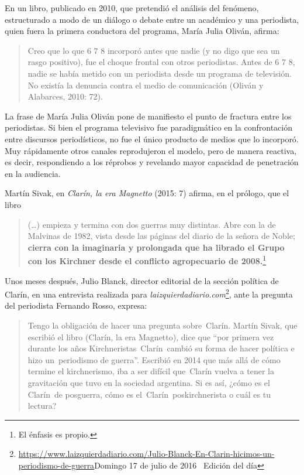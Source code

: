 En un libro, publicado en 2010, que pretendió el análisis del fenómeno, estructurado a modo de un diálogo o debate entre un académico y una periodista, quien fuera la primera conductora del programa, María Julia Oliván, afirma:

\begin{quote}
Creo que lo que 6 7 8 incorporó antes que nadie (y no digo que sea un rasgo positivo), fue el choque frontal con otros periodistas. Antes de 6 7 8, nadie se había metido con un periodista desde un programa de televisión. No existía la denuncia contra el medio de comunicación (Oliván y Alabarces, 2010: 72).
\end{quote}

La frase de María Julia Oliván pone de manifiesto el punto de fractura entre los periodistas. Si bien el programa televisivo fue paradigmático en la confrontación entre discursos periodísticos, no fue el único producto de medios que lo incorporó. Muy rápidamente otros canales reprodujeron el modelo, pero de manera reactiva, es decir, respondiendo a los réprobos y revelando mayor capacidad de penetración en la audiencia.

Martín Sivak, en \emph{Clarín, la era Magnetto} (2015: 7) afirma, en el prólogo, que el libro

\begin{quote}
(\ldots) empieza y termina con dos guerras muy distintas. Abre con la de Malvinas de 1982, vista desde las páginas del diario de la señora de Noble; \textbf{cierra con la imaginaria y prolongada que ha librado el Grupo con los Kirchner desde el conflicto agropecuario de 2008.}\footnote{El énfasis es propio.}
\end{quote}

Unos meses después, Julio Blanck, director editorial de la sección política de Clarín, en una entrevista realizada para \emph{laizquierdadiario.com}\footnote{\url{https://www.laizquierdadiario.com/Julio-Blanck-En-Clarin-hicimos-un-periodismo-de-guerra}Domingo 17 de julio de 2016~\textbar{} Edición del día}, ante la pregunta del periodista Fernando Rosso, expresa:

\begin{quote}
Tengo la obligación de hacer una pregunta sobre~Clarín. Martín Sivak, que escribió el libro (Clarín, la era Magnetto), dice que ``por primera vez durante los años Kirchneristas~Clarín~cambió su forma de hacer política e hizo un~periodismo de guerra''. Escribió en 2014 que más allá de cómo termine el kirchnerismo, iba a ser difícil que~Clarín vuelva a tener la gravitación que tuvo en la sociedad argentina. Si es así, ¿cómo es el Clarín~de posguerra, cómo es el~Clarín~poskirchnerista o cuál es tu lectura?
\end{quote}

